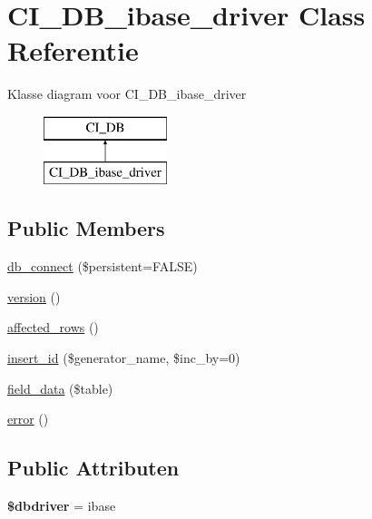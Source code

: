 \hypertarget{class_c_i___d_b__ibase__driver}{}\section{C\+I\+\_\+\+D\+B\+\_\+ibase\+\_\+driver Class Referentie}
\label{class_c_i___d_b__ibase__driver}
Klasse diagram voor C\+I\+\_\+\+D\+B\+\_\+ibase\+\_\+driver\begin{figure}[H]
\begin{center}
\leavevmode
\includegraphics[height=2.000000cm]{class_c_i___d_b__ibase__driver}
\end{center}
\end{figure}
\subsection*{Public Members}
\begin{DoxyCompactItemize}
\item 
\mbox{\hyperlink{class_c_i___d_b__ibase__driver_a52bf595e79e96cc0a7c907a9b45aeb4d}{db\+\_\+connect}} (\$persistent=F\+A\+L\+SE)
\item 
\mbox{\hyperlink{class_c_i___d_b__ibase__driver_a6080dae0886626b9a4cedb29240708b1}{version}} ()
\item 
\mbox{\hyperlink{class_c_i___d_b__ibase__driver_a77248aaad33eb132c04cc4aa3f4bc8cb}{affected\+\_\+rows}} ()
\item 
\mbox{\hyperlink{class_c_i___d_b__ibase__driver_a148521f11a2aad9f228af62f59ec5130}{insert\+\_\+id}} (\$generator\+\_\+name, \$inc\+\_\+by=0)
\item 
\mbox{\hyperlink{class_c_i___d_b__ibase__driver_a90355121e1ed009e0efdbd544ab56efa}{field\+\_\+data}} (\$table)
\item 
\mbox{\hyperlink{class_c_i___d_b__ibase__driver_a43b8d30b879d4f09ceb059b02af2bc02}{error}} ()
\end{DoxyCompactItemize}
\subsection*{Public Attributen}
\begin{DoxyCompactItemize}
\item 
\mbox{\label{class_c_i___d_b__ibase__driver_a0cde2a16322a023d040aa7f725877597}} 
{\bfseries \$dbdriver} = \textquotesingle{}ibase\textquotesingle{}
\end{DoxyCompactItemize}
